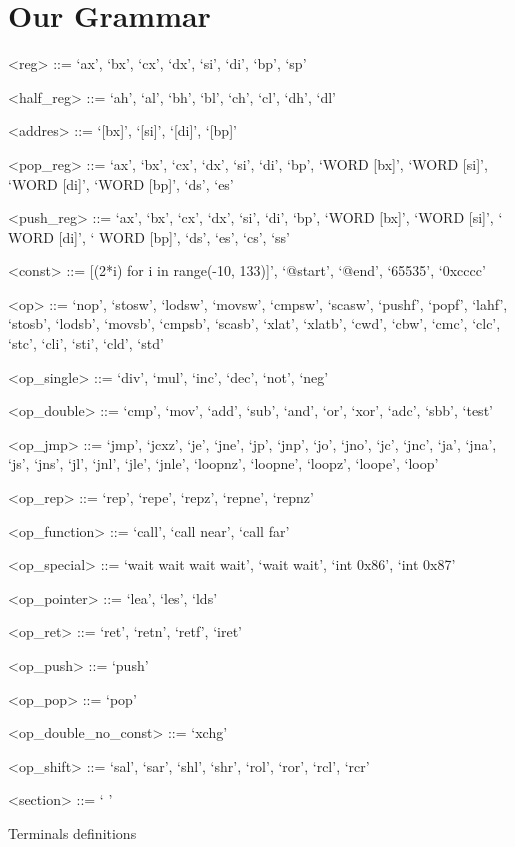 \documentclass[dvipsnames, format=sigconf]{acmart}
\begin{document}
\section{Our Grammar}
\begin{BNF}
\begin{framed}
\begin{grammar}
<reg> ::= `ax', `bx', `cx', `dx', `si', `di', `bp', `sp' 

<half\_reg> ::= `ah', `al', `bh', `bl', `ch', `cl', `dh', `dl'

<addres> ::= `[bx]', `[si]', `[di]', `[bp]'

<pop\_reg> ::= `ax', `bx', `cx', `dx', `si', `di', `bp', `WORD [bx]', `WORD [si]', `WORD [di]', `WORD [bp]', `ds', `es'

<push\_reg> ::= `ax', `bx', `cx', `dx', `si', `di', `bp', `WORD [bx]', `WORD [si]', ` WORD [di]', ` WORD [bp]', `ds', `es', `cs', `ss'

<const> ::= [(2*i) for i in range(-10, 133)]', `@start', `@end', `65535', `0xcccc'

<op> ::= `nop', `stosw', `lodsw', `movsw', `cmpsw', `scasw', `pushf', `popf', `lahf', `stosb', `lodsb', `movsb', `cmpsb', `scasb', `xlat', `xlatb', `cwd', `cbw', `cmc', `clc', `stc', `cli', `sti', `cld', `std'

<op\_single> ::= `div', `mul', `inc', `dec', `not', `neg'

<op\_double> ::= `cmp', `mov', `add', `sub', `and', `or', `xor', `adc', `sbb', `test'

<op\_jmp> ::= `jmp', `jcxz', `je', `jne', `jp', `jnp', `jo', `jno', `jc', `jnc', `ja', `jna', `js', `jns', `jl', `jnl', `jle', `jnle', `loopnz', `loopne', `loopz', `loope', `loop'

<op\_rep> ::= `rep', `repe', `repz', `repne', `repnz'

<op\_function> ::= `call', `call near', `call far'

<op\_special> ::= `wait wait wait wait', `wait wait', `int 0x86', `int 0x87'

<op\_pointer> ::= `lea', `les', `lds'

<op\_ret> ::= `ret', `retn', `retf', `iret'

<op\_push> ::= `push'

<op\_pop> ::= `pop'

<op\_double\_no\_const> ::= `xchg'

<op\_shift> ::= `sal', `sar', `shl', `shr', `rol', `ror', `rcl', `rcr'

<section> ::= ` ' 
\end{grammar}
\end{framed}\vspace{-1em}
\caption{Terminals definitions}\vspace{2em}
\label{tab:1_terminal_set}
\end{BNF}
\end{document}
